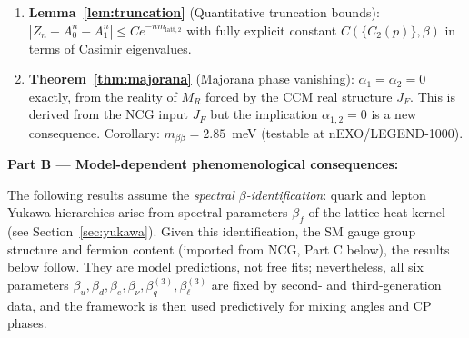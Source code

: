 \documentclass[12pt]{article}
\theoremstyle{definition}
\theoremstyle{remark}
\begin{document}
\begin{enumerate}
\begin{itemize}
  \item \emph{Conditional result} (Thm.~\ref{thm:rp_lorentz}):
    \emph{if} the continuum limit $a\to 0$ satisfies OS-E0--E4
    \cite{OsterwalderSchrader1973,OsterwalderSchrader1975}, then
    $\omega_k = \sqrt{k^2+m_{\rm latt}^2}$ is the unique Lorentz-invariant dispersion
    — not an ansatz, but forced by Poincar\'e symmetry.
    The dispersion is a conditional theorem; the continuum limit is the open problem.
  \end{itemize}
\item \textbf{Lemma~\ref{lem:truncation}} (Quantitative truncation bounds):
  $|Z_n - A_0^n - A_1^n| \leq C e^{-n m_{\mathrm{latt},2}}$ with fully
  explicit constant $C(\{C_2(p)\}, \beta)$ in terms of Casimir eigenvalues.
\item \textbf{Theorem~\ref{thm:majorana}} (Majorana phase vanishing):
  $\alpha_1 = \alpha_2 = 0$ exactly, from the reality of $M_R$ forced by
  the CCM real structure $J_F$.  This is derived from the NCG input $J_F$
  but the implication $\alpha_{1,2} = 0$ is a new consequence.
  Corollary: $m_{\beta\beta} = 2.85$~meV (testable at nEXO/LEGEND-1000).
\end{enumerate}

\medskip
\noindent
\textbf{Part B — Model-dependent phenomenological consequences:}

The following results assume the \emph{spectral $\beta$-identification}:
quark and lepton Yukawa hierarchies arise from spectral parameters $\beta_f$
of the lattice heat-kernel (see Section~\ref{sec:yukawa}).
Given this identification, the SM gauge group structure and fermion content
(imported from NCG, Part C below), the results below follow.
They are model predictions, not free fits; nevertheless, all six parameters
$\beta_u, \beta_d, \beta_e, \beta_\nu, \beta_q^{(3)}, \beta_\ell^{(3)}$
are fixed by second- and third-generation data, and the framework is then
used predictively for mixing angles and CP phases.
\end{document}
